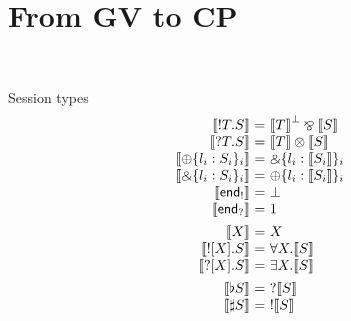 \documentclass{easychair}
\makeatletter
\newcommand{\ba}{\begin{array}}
\newcommand{\ea}{\end{array}}
\newenvironment{equations}{\[\ba{@{}r@{~}c@{~}l@{}}}{\ea\]}
\newcommand{\key}{\mathsf}
\newcommand{\set}[1]{\{ #1 \}}
\newcommand{\gvtocp}[1]{\llbracket{#1}\rrbracket}
\newcommand{\row}[2]{\set{#1}_{#2}}
\newcommand{\gvOutput}[2]{\mathord{!}{#1}.{#2}}
\newcommand{\gvInput}[2]{\mathord{?}{#1}.{#2}}
\newcommand{\gvEndOutput}{\key{end}_!}
\newcommand{\gvEndInput}{\key{end}_?}
\newcommand{\gvPlus}[2]{\oplus \row{#1}{#2}}
\newcommand{\gvChoice}[2]{\binampersand \row{#1}{#2}}
\newcommand{\gvServer}[1]{\flat {#1}}
\newcommand{\gvService}[1]{\sharp {#1}}
\newcommand{\gvDual}[1]{\overline{#1}}
\newcommand{\gvOutputType}[2]{![{#1}].{#2}}
\newcommand{\gvInputType}[2]{?[{#1}].{#2}}
\newcommand{\gvj}[3]{{#1} \vdash {#2} : {#3}}
\newcommand{\la}{l}
\newcommand{\gvLink}[2]{\key{link}~{#1}~{#2}}
\newcommand{\gvSendType}[2]{\key{sendType}~{#1}~{#2}}
\newcommand{\gvReceiveType}[1]{\key{receiveType}~{#1}}
\newcommand{\gvServeOld}[3]{\key{serve}~{#1}({#2})={#3}}
\newcommand{\gvRequest}[1]{\key{request}~{#1}}
\newcommand{\cpTimes}[2]{{#1} \otimes {#2}}
\newcommand{\cpPar}[2]{{#1} \mathbin{\bindnasrepma} {#2}}
\newcommand{\cpPlus}[2]{\oplus \row{#1}{#2}}
\newcommand{\cpWith}[2]{\binampersand \row{#1}{#2}}
\newcommand{\cpOne}{1}
\newcommand{\cpBottom}{\bot}
\newcommand{\cpOfCourse}[1]{!{#1}}
\newcommand{\cpWhyNot}[1]{?{#1}}
\newcommand{\cpDual}[1]{{#1}^\bot}
\newcommand{\cpExists}[2]{\exists {#1}.{#2}}
\newcommand{\cpForall}[2]{\forall {#1}.{#2}}
\newcommand{\FV}[1]{\mathit{FV}(#1)}
\makeatother
\begin{document}
\appendix








\newpage

\section{From GV to CP}
~

Session types
\begin{equations}
\gvtocp{\gvOutput{T}{S}}        &=& \cpPar{\cpDual{\gvtocp{T}}}{\gvtocp{S}} \\
\gvtocp{\gvInput{T}{S}}         &=& \cpTimes{\gvtocp{T}}{\gvtocp{S}} \\
\gvtocp{\gvPlus{\la_i:S_i}{i}}   &=& \cpWith{\la_i:\gvtocp{S_i}}{i} \\
\gvtocp{\gvChoice{\la_i:S_i}{i}} &=& \cpPlus{\la_i:\gvtocp{S_i}}{i} \\
\gvtocp{\gvEndOutput}              &=& \cpBottom \\
\gvtocp{\gvEndInput}               &=& \cpOne \\[1ex]

\gvtocp{X}                       &=& X \\
\gvtocp{\gvOutputType{X}{S}}     &=& \cpForall{X}{\gvtocp{S}} \\
\gvtocp{\gvInputType{X}{S}}      &=& \cpExists{X}{\gvtocp{S}} \\[1ex]

\gvtocp{\gvServer{S}}  &=& \cpWhyNot{\gvtocp{S}} \\
\gvtocp{\gvService{S}} &=& \cpOfCourse{\gvtocp{S}} \\[1ex]
\end{equations}
\end{document}
